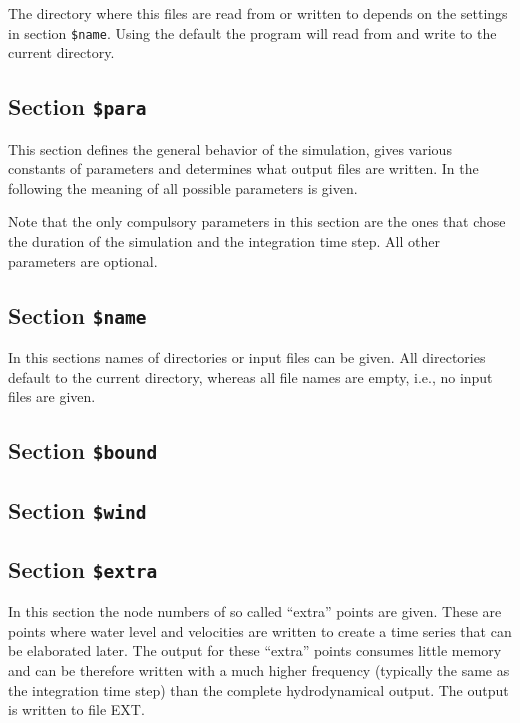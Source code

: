 \documentclass{report}
\begin{document}
The directory where this files are read from or written to depends
on the settings in section {\tt \$name}. Using the default
the program will read from and write to the current directory.

\subsection{Section {\tt \$para}}

This section defines the general behavior of the simulation,
gives various constants of parameters and determines what
output files are written. In the following the meaning of
all possible parameters is given.

Note that the only compulsory parameters in this section are 
the ones that chose the duration of the simulation and the
integration time step. All other parameters are optional.



\subsection{Section {\tt \$name}}

In this sections names of directories or input files can be
given. All directories default to the current directory,
whereas all file names are empty, i.e., no input files are
given.




\subsection{Section {\tt \$bound}}




\subsection{Section {\tt \$wind}}





\subsection{Section {\tt \$extra}}

In this section the node numbers of so called ``extra'' points are given. 
These are points where water level and velocities are written to create
a time series that can be elaborated later. The output for these ``extra''
points consumes little memory and can be therefore written with a
much higher frequency (typically the same as the integration time step)
than the complete hydrodynamical output. The output is written
to file EXT.
\end{document}
